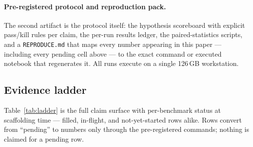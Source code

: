 \documentclass{article}
\begin{document}
\paragraph{Pre-registered protocol and reproduction pack.} The second
artifact is the protocol itself: the hypothesis scoreboard with explicit
pass/kill rules per claim, the per-run results ledger, the paired-statistics
scripts, and a \texttt{REPRODUCE.md} that maps every number appearing in
this paper --- including every pending cell above --- to the exact command or
executed notebook that regenerates it. All runs execute on a single
126\,GB workstation.

\subsection{Evidence ladder}
\label{sec:ladder}

Table~\ref{tab:ladder} is the full claim surface with per-benchmark status
at scaffolding time --- filled, in-flight, and not-yet-started rows alike.
Rows convert from ``pending'' to numbers only through the pre-registered
commands; nothing is claimed for a pending row.
\end{document}
